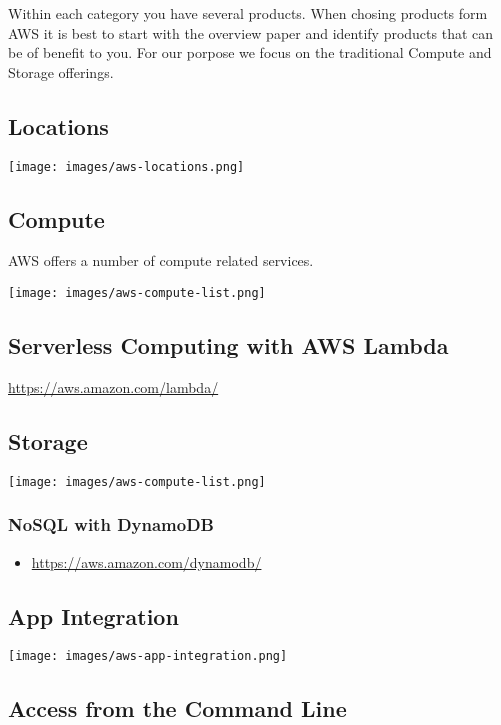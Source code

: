 Within each category you have several products. When chosing products
form AWS it is best to start with the overview paper and identify
products that can be of benefit to you. For our porpose we focus on the
traditional Compute and Storage offerings.

\subsection{Locations}

\texttt{[image: images/aws-locations.png]}

\subsection{Compute}

AWS offers a number of compute related services.

\texttt{[image: images/aws-compute-list.png]}

\subsection{Serverless Computing with AWS Lambda}

\url{https://aws.amazon.com/lambda/}

\subsection{Storage}

\texttt{[image: images/aws-compute-list.png]}

\subsubsection{NoSQL with DynamoDB}

\begin{itemize}
\item
  \url{https://aws.amazon.com/dynamodb/}
\end{itemize}

\subsection{App Integration}

\texttt{[image: images/aws-app-integration.png]}

\subsection{Access from the Command Line}

